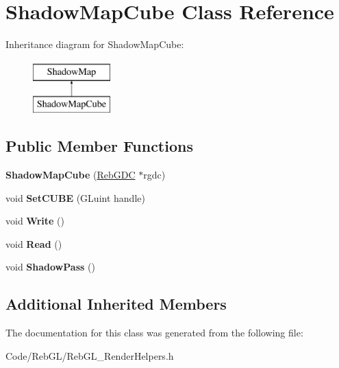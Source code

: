 \hypertarget{class_shadow_map_cube}{}\section{Shadow\+Map\+Cube Class Reference}
\label{class_shadow_map_cube}
Inheritance diagram for Shadow\+Map\+Cube\+:\begin{figure}[H]
\begin{center}
\leavevmode
\includegraphics[height=2.000000cm]{class_shadow_map_cube}
\end{center}
\end{figure}
\subsection*{Public Member Functions}
\begin{DoxyCompactItemize}
\item 
{\bfseries Shadow\+Map\+Cube} (\hyperlink{class_reb_g_d_c}{Reb\+G\+DC} $\ast$rgdc)\hypertarget{class_shadow_map_cube_a1eb935060de59b9d3390934872ed62a3}{}\label{class_shadow_map_cube_a1eb935060de59b9d3390934872ed62a3}

\item 
void {\bfseries Set\+C\+U\+BE} (G\+Luint handle)\hypertarget{class_shadow_map_cube_af54661a08f78957988157f04bf1cf653}{}\label{class_shadow_map_cube_af54661a08f78957988157f04bf1cf653}

\item 
void {\bfseries Write} ()\hypertarget{class_shadow_map_cube_a4a986b24fa88082c10af4b39331c90b2}{}\label{class_shadow_map_cube_a4a986b24fa88082c10af4b39331c90b2}

\item 
void {\bfseries Read} ()\hypertarget{class_shadow_map_cube_aa28ca8347c510cbcb5783fec86cf4900}{}\label{class_shadow_map_cube_aa28ca8347c510cbcb5783fec86cf4900}

\item 
void {\bfseries Shadow\+Pass} ()\hypertarget{class_shadow_map_cube_a0ad17f5e63a4fab9a82813fb4adee9a4}{}\label{class_shadow_map_cube_a0ad17f5e63a4fab9a82813fb4adee9a4}

\end{DoxyCompactItemize}
\subsection*{Additional Inherited Members}


The documentation for this class was generated from the following file\+:\begin{DoxyCompactItemize}
\item 
Code/\+Reb\+G\+L/Reb\+G\+L\+\_\+\+Render\+Helpers.\+h\end{DoxyCompactItemize}
